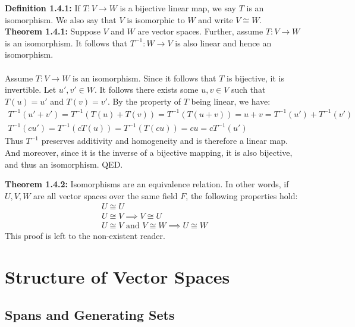 \documentclass[11pt]{article}
\begin{document}
\textbf{Definition 1.4.1:} If $T : V \rightarrow W$ is a bijective linear map, we say $T$ is an isomorphism. We also say that $V$ is isomorphic to $W$ and write $V \cong W$. \\
\textbf{Theorem 1.4.1:} Suppose $V$ and $W$ are vector spaces. Further, assume $T : V \rightarrow W$ is an isomorphism. It follows that $T^{-1} : W \rightarrow V$ is also linear and hence an isomorphism. \\
\vspace{0.1cm} \\
Assume $T : V \rightarrow W$ is an isomorphism. Since it follows that $T$ is bijective, it is invertible. Let $u',v' \in W$. It follows there exists some $u,v \in V$ such that $T(u) = u'$ and $T(v) = v'$. By the property of $T$ being linear, we have:
\begin{gather*}
    T^{-1}(u' + v') = T^{-1}(T(u) + T(v)) = T^{-1}(T(u+v)) = u + v = T^{-1}(u') + T^{-1}(v')\\
    T^{-1}(cu') = T^{-1}(cT(u)) = T^{-1}(T(cu)) = cu = cT^{-1}(u')
\end{gather*}
Thus $T^{-1}$ preserves additivity and homogeneity and is therefore a linear map. And moreover, since it is the inverse of a bijective mapping, it is also bijective, and thus an isomorphism. QED. 

\newpage

\textbf{Theorem 1.4.2:} Isomorphisms are an equivalence relation. In other words, if $U,V,W$ are all vector spaces over the same field $F$, the following properties hold:
\begin{gather*}
    U \cong U \\ 
    U \cong V \implies V \cong U \\
    U \cong V \text{ and } V \cong W \implies U \cong W
\end{gather*}
This proof is left to the non-existent reader.

\section{Structure of Vector Spaces}

\subsection{Spans and Generating Sets}
\end{document}
